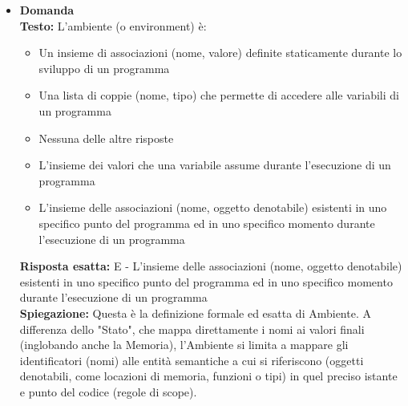 \documentclass[12pt, a4paper]{article}
\newcounter{domandateoria}
\begin{document}
\newpage

\begin{itemize}
    \item {}\textbf{Domanda \thedomandateoria} \\
    \textbf{Testo:} L'ambiente (o environment) è:
    \begin{itemize}
        \item[A)] Un insieme di associazioni (nome, valore) definite staticamente durante lo sviluppo di un programma
        \item[B)] Una lista di coppie (nome, tipo) che permette di accedere alle variabili di un programma
        \item[C)] Nessuna delle altre risposte
        \item[D)] L'insieme dei valori che una variabile assume durante l'esecuzione di un programma
        \item[E)] L'insieme delle associazioni (nome, oggetto denotabile) esistenti in uno specifico punto del programma ed in uno specifico momento durante l'esecuzione di un programma
    \end{itemize}
    \textbf{Risposta esatta:} E - L'insieme delle associazioni (nome, oggetto denotabile) esistenti in uno specifico punto del programma ed in uno specifico momento durante l'esecuzione di un programma \\
    \textbf{Spiegazione:} Questa è la definizione formale ed esatta di Ambiente. A differenza dello "Stato", che mappa direttamente i nomi ai valori finali (inglobando anche la Memoria), l'Ambiente si limita a mappare gli identificatori (nomi) alle entità semantiche a cui si riferiscono (oggetti denotabili, come locazioni di memoria, funzioni o tipi) in quel preciso istante e punto del codice (regole di scope).
    \vspace{0.3cm}


\end{itemize}
\end{document}
